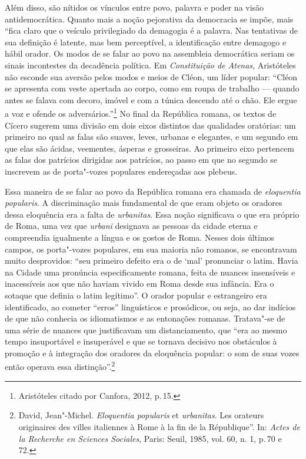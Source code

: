 Além disso, são nítidos os vínculos entre povo, palavra e poder na visão
antidemocrática. Quanto mais a noção pejorativa da democracia se impõe,
mais ``fica claro que o veículo privilegiado da demagogia é a palavra.
Nas tentativas de sua definição é latente, mas bem perceptível, a
identificação entre demagogo e hábil orador. Os modos de se falar ao
povo na assembleia democrática seriam os sinais incontestes da
decadência política. Em \emph{Constituição de Atenas}, Aristóteles não
esconde sua aversão pelos modos e meios de Cléon, um líder popular:
``Cléon se apresenta com veste apertada ao corpo, como em roupa de
trabalho --- quando antes se falava com decoro, imóvel e com a túnica
descendo até o chão. Ele ergue a voz e ofende os
adversários.''\footnote{Aristóteles citado por Canfora, 2012, p.\,15.} No
final da República romana, os textos de Cícero sugerem uma divisão em
dois eixos distintos das qualidades oratórias: um primeiro no qual as
falas são suaves, leves, urbanas e elegantes, e um segundo em que elas
são ácidas, veementes, ásperas e grosseiras. Ao primeiro eixo pertencem
as falas dos patrícios dirigidas aos patrícios, ao passo em que no
segundo se inscrevem as de porta"-vozes populares endereçadas aos
plebeus.

Essa maneira de se falar ao povo da República romana era chamada de
\emph{eloquentia popularis}. A discriminação mais fundamental de que
eram objeto os oradores dessa eloquência era a falta de
\emph{urbanitas}. Essa noção significava o que era próprio de Roma, uma
vez que \emph{urbani} designava as pessoas da cidade eterna e
compreendia igualmente a língua e os gostos de Roma. Nesses dois últimos
campos, os porta"-vozes populares, em sua maioria não romanos, se
encontravam muito desprovidos: ``seu primeiro defeito era o de `mal'
pronunciar o latim. Havia na Cidade uma pronúncia especificamente
romana, feita de nuances insensíveis e inacessíveis aos que não haviam
vivido em Roma desde sua infância. Era o sotaque que definia o latim
legítimo''. O orador popular e estrangeiro era identificado, ao cometer
``erros'' linguísticos e prosódicos, ou seja, ao dar indícios de que não
conhecia os idiomatismos e as entonações romanas. Tratava"-se de uma
série de nuances que justificavam um distanciamento, que ``era ao mesmo
tempo insuportável e insuperável e que se tornava decisivo nos
obstáculos à promoção e à integração dos oradores da eloquência popular:
o som de suas vozes então operava essa distinção''.\footnote{David,
  Jean"-Michel. \emph{Eloquentia popularis} et \emph{urbanitas}. Les
  orateurs originaires des villes italiennes à Rome à la fin de la
  République''. In: \emph{Actes de la Recherche en Sciences Sociales},
  Paris: Seuil, 1985, vol. 60, n. 1, p.\,70 e 72.}

